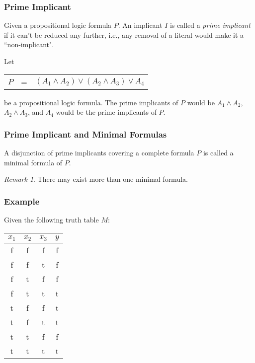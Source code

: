 \documentclass{beamer}
\theoremstyle{remark}
\newtheorem{remark}[theorem]{Remark}
\begin{document}
\begin{frame}
\frametitle{Prime Implicant}

\begin{definition}
Given a propositional logic formula $P$. An implicant $I$ is called a {\em prime implicant} if it can't be reduced any further, i.e., any removal of a literal would make it a ``non-implicant".
\end{definition}

\pause

\begin{example}
	Let 
	\begin{tabular}{ccc}
	$P$ & = & $(A_1 \land A_2) \lor (A_2 \land A_3) \lor A_4$
	\end{tabular}
	be a propositional logic formula. The prime implicants of $P$ would be $A_1 \land A_2$, $A_2 \land A_3$, and $A_4$ would be the prime implicants of $P$.

\end{example}
\end{frame}

\begin{frame}
\frametitle{Prime Implicant and Minimal Formulas}
\begin{definition}
	A disjunction of prime implicants covering a complete formula $P$ is called a minimal formula of $P$.
\end{definition}

\begin{remark}
	There may exist more than one minimal formula.
\end{remark}
\end{frame}

\begin{frame}
\frametitle{Example}
Given the following truth table $M$:
\begin{center}
	\begin{tabular}{c|c|c||c}
		$x_1$ & $x_2$ & $x_3$ & $y$ \\ \hline
		f & f & f & f \\ \hline
		f & f & t & f \\ \hline
		f & t & f & f \\ \hline
		f & t & t & t \\ \hline
		t & f & f & t \\ \hline
		t & f & t & t \\ \hline
		t & t & f & f \\ \hline
		t & t & t & t
	\end{tabular}
\end{center}
\end{frame}
\end{document}
